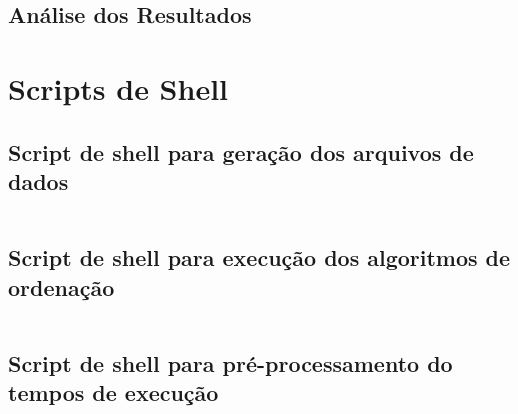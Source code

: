 \documentclass[a4paper,12pt]{scrartcl}
\begin{document}
\subsection{Análise dos Resultados}
\label{sec:analise-result}


\newpage

\appendix

\section{Scripts de Shell}
\label{sec:scripts-de-shell}

\subsection{Script de shell para geração dos arquivos de dados}
\label{lst:mkdata}

\inputminted[linenos,fontsize=\footnotesize]{bash}{../mkdata.sh}


\subsection{Script de shell para execução dos algoritmos de ordenação}
\label{lst:collect-times}

\inputminted[linenos,breaklines,fontsize=\footnotesize]{bash}{../collect-times.sh}


\subsection{Script de shell para pré-processamento do tempos de execução}
\label{lst:prepare-times}

\inputminted[linenos,breaklines,fontsize=\footnotesize]{scala}{../report-data/prepare.sc}
\end{document}
